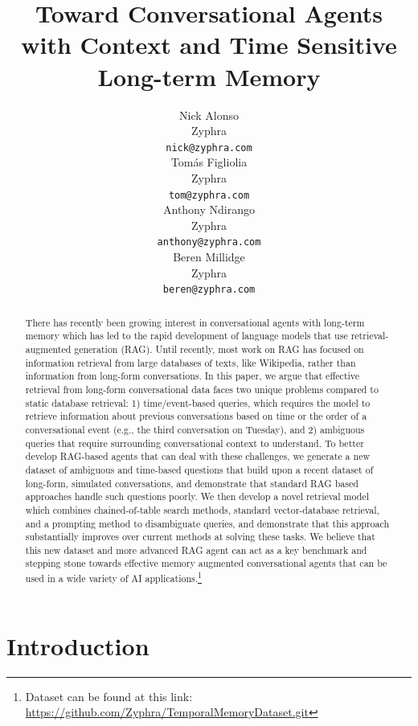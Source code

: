 \documentclass{article}
\title{Toward Conversational Agents with Context and Time Sensitive Long-term Memory}
\author{%
  Nick Alonso\\
  Zyphra\\
  \texttt{nick@zyphra.com} \\
  \And
  Tomás Figliolia \\
  Zyphra \\
  \texttt{tom@zyphra.com} \\
  \AND
  Anthony Ndirango \\
  Zyphra \\
  \texttt{anthony@zyphra.com} \\
  \And
  Beren Millidge \\
  Zyphra \\
  \texttt{beren@zyphra.com} \\
}
\begin{document}
\maketitle


\begin{abstract}
There has recently been growing interest in conversational agents with long-term memory which has led to the rapid development of language models that use retrieval-augmented generation (RAG). Until recently, most work on RAG has focused on information retrieval from large databases of texts, like Wikipedia, rather than information from long-form conversations. In this paper, we argue that effective retrieval from long-form conversational data faces two unique problems compared to static database retrieval: 1) time/event-based queries, which requires the model to retrieve information about previous conversations based on time or the order of a conversational event (e.g., the third conversation on Tuesday), and 2) ambiguous queries that require surrounding conversational context to understand. To better develop RAG-based agents that can deal with these challenges, we generate a new dataset of ambiguous and time-based questions that build upon a recent dataset of long-form, simulated conversations, and demonstrate that standard RAG based approaches handle such questions poorly. We then develop a novel retrieval model which combines chained-of-table search methods, standard vector-database retrieval, and a prompting method to disambiguate queries, and demonstrate that this approach substantially improves over current methods at solving these tasks. We believe that this new dataset and more advanced RAG agent can act as a key benchmark and stepping stone towards effective memory augmented conversational agents that can be used in a wide variety of AI applications.\footnote{Dataset can be found at this link: \url{https://github.com/Zyphra/TemporalMemoryDataset.git}}
\end{abstract}


\section{Introduction}
\end{document}
